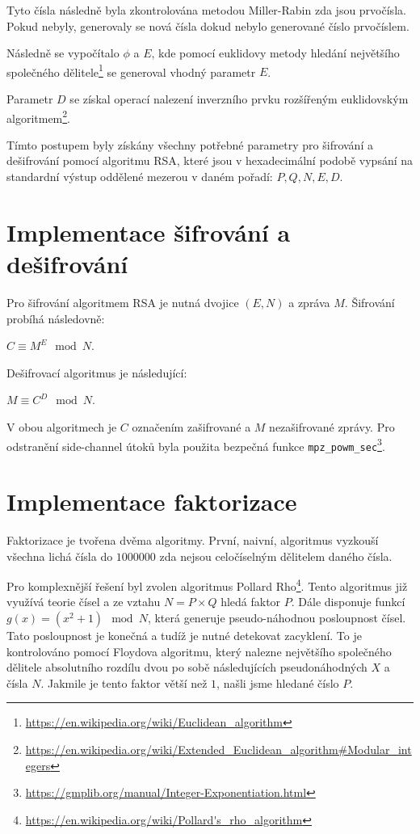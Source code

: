 \documentclass[11pt,a4paper]{article}
\begin{document}
Tyto čísla následně byla zkontrolována metodou Miller-Rabin zda jsou prvočísla. Pokud nebyly, generovaly se nová čísla
dokud nebylo generované číslo prvočíslem.

Následně se vypočítalo $\phi$ a $E$, kde pomocí euklidovy metody hledání největšího společného
dělitele\footnote{\url{https://en.wikipedia.org/wiki/Euclidean_algorithm}} se generoval vhodný parametr $E$.

Parametr $D$ se získal operací nalezení inverzního prvku rozšířeným euklidovským algoritmem\footnote{
\url{https://en.wikipedia.org/wiki/Extended_Euclidean_algorithm#Modular_integers}}.

Tímto postupem byly získány všechny potřebné parametry pro šifrování a dešifrování pomocí algoritmu RSA, které jsou
v hexadecimální podobě vypsání na standardní výstup oddělené mezerou v daném pořadí: $P, Q, N, E, D$.

\section{Implementace šifrování a dešifrování}

Pro šifrování algoritmem RSA je nutná dvojice $(E, N)$ a zpráva $M$. Šifrování probíhá následovně:
\begin{center}
    $C \equiv M^E \mod N$.
\end{center}

\noindent Dešifrovací algoritmus je následující:
\begin{center}
    $M \equiv C^D \mod N$.
\end{center}

\noindent V obou algoritmech je $C$ označením zašifrované a $M$ nezašifrované zprávy. Pro odstranění side-channel útoků
byla použita bezpečná funkce \texttt{mpz\_powm\_sec}\footnote{\url{https://gmplib.org/manual/Integer-Exponentiation.html}}.

\section{Implementace faktorizace}
Faktorizace je tvořena dvěma algoritmy. První, naivní, algoritmus vyzkouší všechna lichá čísla do $1000000$ zda nejsou
celočíselným dělitelem daného čísla.

Pro komplexnější řešení byl zvolen algoritmus Pollard Rho\footnote{\url{https://en.wikipedia.org/wiki/Pollard's_rho_algorithm}}.
Tento algoritmus již využívá teorie čísel a ze vztahu $N = P \times Q$ hledá faktor $P$. Dále disponuje funkcí
$g(x) = (x^2 + 1) \mod N$, která generuje pseudo-náhodnou posloupnost čísel. Tato posloupnost je konečná a tudíž je
nutné detekovat zacyklení. To je kontrolováno pomocí Floydova algoritmu, který nalezne největšího společného dělitele
absolutního rozdílu dvou po sobě následujících pseudonáhodných $X$ a čísla $N$. Jakmile je tento faktor větší než $1$,
našli jsme hledané číslo $P$.
\end{document}
